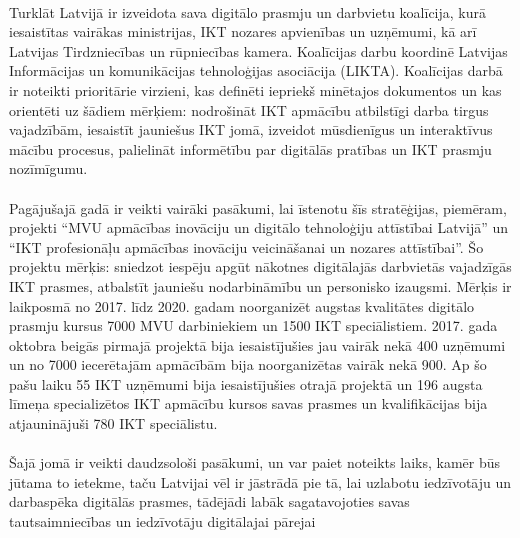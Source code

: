 \paragraph{}
Turklāt Latvijā ir izveidota sava digitālo prasmju un darbvietu koalīcija, kurā iesaistītas
vairākas ministrijas, IKT nozares apvienības un uzņēmumi, kā arī Latvijas Tirdzniecības un
rūpniecības kamera. Koalīcijas darbu koordinē Latvijas Informācijas un komunikācijas
tehnoloģijas asociācija (LIKTA). Koalīcijas darbā ir noteikti prioritārie virzieni, kas definēti
iepriekš minētajos dokumentos un kas orientēti uz šādiem mērķiem: nodrošināt IKT
apmācību atbilstīgi darba tirgus vajadzībām, iesaistīt jauniešus IKT jomā, izveidot
mūsdienīgus un interaktīvus mācību procesus, palielināt informētību par digitālās pratības un
IKT prasmju nozīmīgumu.
\paragraph{}
Pagājušajā gadā ir veikti vairāki pasākumi, lai īstenotu šīs stratēģijas, piemēram, projekti
“MVU apmācības inovāciju un digitālo tehnoloģiju attīstībai Latvijā” un “IKT profesionāļu
apmācības inovāciju veicināšanai un nozares attīstībai”. Šo projektu mērķis: sniedzot
iespēju apgūt nākotnes digitālajās darbvietās vajadzīgās IKT prasmes, atbalstīt jauniešu
nodarbināmību un personisko izaugsmi. Mērķis ir laikposmā no 2017. līdz 2020. gadam
noorganizēt augstas kvalitātes digitālo prasmju kursus 7000 MVU darbiniekiem un 1500 IKT
speciālistiem. 2017. gada oktobra beigās pirmajā projektā bija iesaistījušies jau vairāk nekā
400 uzņēmumi un no 7000 iecerētajām apmācībām bija noorganizētas vairāk nekā 900. Ap
šo pašu laiku 55 IKT uzņēmumi bija iesaistījušies otrajā projektā un 196 augsta līmeņa
specializētos IKT apmācību kursos savas prasmes un kvalifikācijas bija atjauninājuši 780 IKT
speciālistu.
\paragraph{}
Šajā jomā ir veikti daudzsološi pasākumi, un var paiet noteikts laiks, kamēr būs jūtama to
ietekme, taču Latvijai vēl ir jāstrādā pie tā, lai uzlabotu iedzīvotāju un darbaspēka digitālās
prasmes, tādējādi labāk sagatavojoties savas tautsaimniecības un iedzīvotāju digitālajai
pārejai